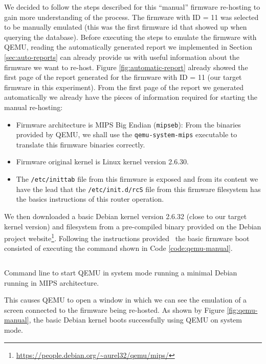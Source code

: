 We decided to follow the steps described for this ``manual'' firmware re-hosting to gain more understanding of the process. The firmware with ID = 11 was selected to be manually emulated (this was the first firmware id that showed up when querying the database). Before executing the steps to emulate the firmware with QEMU, reading the automatically generated report we implemented in Section \ref{sec:auto-reports} can already provide us with useful information about the firmware we want to re-host. Figure \ref{fig:automatic-report} already showed the first page of the report generated for the firmware with ID = 11 (our target firmware in this experiment). From the first page of the report we generated automatically we already have the pieces of information required for starting the manual re-hosting:

\begin{itemize}
    \item Firmware architecture is MIPS Big Endian ({\tt mipseb}): From the binaries provided by QEMU, we shall use the {\tt qemu-system-mips} executable to translate this firmware binaries correctly.
    \item Firmware original kernel is Linux kernel version 2.6.30.
    \item The {\tt /etc/inittab} file from this firmware is exposed and from its content we have the lead that the {\tt /etc/init.d/rcS} file from this firmware filesystem has the basics instructions of this router operation.
\end{itemize}

We then downloaded a basic Debian kernel version 2.6.32 (close to our target kernel version) and filesystem from a pre-compiled binary provided on the Debian project website\footnote{\url{https://people.debian.org/~aurel32/qemu/mips/}}. Following the instructions provided~\cite{victor-sales} the basic firmware boot consisted of executing the command shown in Code \ref{code:qemu-manual}.

\begin{listing}[!ht]
\inputminted[fontsize=\footnotesize,breaklines]{text}{Code/qemu-manual}
\caption{Command line to start QEMU in system mode running a minimal Debian running in MIPS architecture.}
\label{code:qemu-manual}
\end{listing}

This causes QEMU to open a window in which we can see the emulation of a screen connected to the firmware being re-hosted. As shown by Figure \ref{fig:qemu-manual}, the basic Debian kernel boots successfully using QEMU on system mode.

